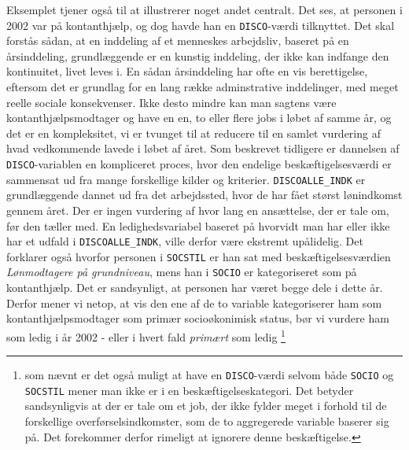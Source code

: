 Eksemplet tjener også til at illustrerer noget andet centralt. Det ses, at personen i 2002 var på kontanthjælp, og dog havde han en \texttt{DISCO}-værdi tilknyttet. Det skal forstås sådan, at en inddeling af et menneskes arbejdsliv, baseret på en årsinddeling, grundlæggende er en kunstig inddeling, der ikke kan indfange den kontinuitet, livet leves i. En sådan årsinddeling har ofte en vis berettigelse, eftersom det er grundlag for en lang række adminstrative inddelinger, med meget reelle sociale konsekvenser. Ikke desto mindre kan man sagtens være kontanthjælpsmodtager og have en en, to eller flere jobs i løbet af samme år, og det er en kompleksitet, vi er tvunget til at reducere til en samlet vurdering af hvad vedkommende lavede i løbet af året. Som beskrevet tidligere er dannelsen af \texttt{DISCO}-variablen en kompliceret proces, hvor den endelige beskæftigelsesværdi er sammensat ud fra mange forskellige kilder og kriterier. \texttt{DISCOALLE\_INDK} er grundlæggende dannet ud fra det arbejdssted, hvor de har fået størst lønindkomst gennem året. Der er ingen vurdering af hvor lang en ansættelse, der er tale om, før den tæller med. En ledighedsvariabel baseret på hvorvidt man har eller ikke har et udfald i \texttt{DISCOALLE\_INDK}, ville derfor være ekstremt upålidelig. Det forklarer også hvorfor personen i \texttt{SOCSTIL} er han sat med beskæftigelsesværdien \emph{Lønmodtagere på grundniveau}, mens han i \texttt{SOCIO} er kategoriseret som på kontanthjælp. Det er sandsynligt, at personen har været begge dele i dette år. Derfor mener vi netop, at vis den ene af de to variable kategoriserer ham som kontanthjælpsmodtager som primær socioøkonimisk status, bør vi vurdere ham som ledig i år 2002 - eller i hvert fald \emph{primært} som ledig \footnote{som nævnt er det også muligt at have en \texttt{DISCO}-værdi selvom både \texttt{SOCIO} og \texttt{SOCSTIL} mener man ikke er i en beskæftigelseskategori. Det betyder sandsynligvis at der er tale om et job, der ikke fylder meget i forhold til de forskellige overførselsindkomster, som de to aggregerede variable baserer sig på. Det forekommer derfor rimeligt at ignorere denne beskæftigelse.}


